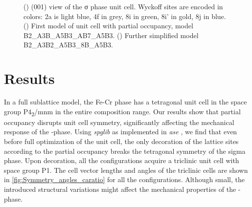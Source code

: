 \documentclass[superscriptaddress, 12pt]{revtex4-2}%
\begin{document}
\begin{figure}

  \caption{\protect\label{fig:PartialOccupancies}
    () 
    (001) view of the σ phase unit cell.
    Wyckoff sites are encoded in colors: 2a is light blue,
    4f in grey, 8i in green, 8i' in gold, 8j in blue.
    () 
    First model of unit cell with partial occupancy, model B2\_A3B\_A5B3\_AB7\_A5B3.
    () 
    Further simplified model B2\_A3B2\_A5B3\_8B\_A5B3.
  }

\end{figure}

\section{Results}

In a full sublattice model, the Fe-Cr \textsigma phase has a tetragonal unit cell in the space group P4\textsubscript{2}/mnm in the entire composition range.  
Our results show that partial occupancy disrupts unit cell symmetry, significantly affecting the mechanical response of the \textsigma-phase.  
Using \textit{spglib} as implemented in \textit{ase} , we find that even before full optimization of the unit cell, the only decoration of the lattice  sites according to the partial occupancy breaks the tetragonal symmetry of the sigma phase.  
Upon decoration, all the configurations acquire a triclinic unit cell with space group P1. 
The cell vector lengths and angles of the triclinic cells are shown in \autoref{fig:Symmetry_angles_caratio} for all the configurations.  
Although small, the introduced structural variations might affect the mechanical properties of the \textsigma -phase. 
\end{document}
